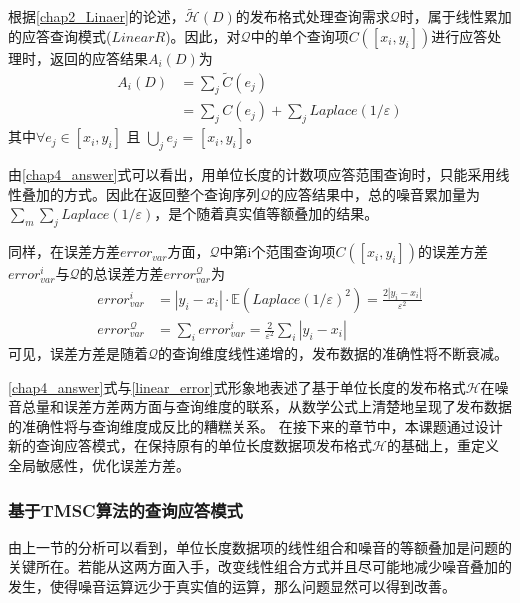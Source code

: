 根据\ref{chap2_Linaer}的论述，$\tilde{\mathcal{H}}(D)$的发布格式处理查询需求$\mathcal{Q}$时，属于线性累加的应答查询模式($LinearR$)。因此，对$\mathcal{Q}$中的单个查询项$C([x_{i},y_{i}])$进行应答处理时，返回的应答结果$A_{i}(D)$为
\begin{equation}
\label{chap4_answer}
\begin{split}
	A_{i}(D) &= \sum\limits_j \widetilde{C}(e_{j})\\
			 &= \sum\limits_j C(e_{j}) + \sum\limits_j \textit{Laplace}(1/\varepsilon)
\end{split}	
\end{equation}
其中$ \forall e_{j} \in [x_{i},y_{i}]$ 且 $\bigcup\limits_j e_{j}$ = $[x_{i},y_{i}]$。


由\ref{chap4_answer}式可以看出，用单位长度的计数项应答范围查询时，只能采用线性叠加的方式。因此在返回整个查询序列$\mathcal{Q}$的应答结果中，总的噪音累加量为$\sum\limits_m {\sum\limits_j \textit{Laplace}(1/\varepsilon)}$，是个随着真实值等额叠加的结果。

同样，在误差方差$error_{var}$方面，$\mathcal{Q}$中第i个范围查询项$C([x_{i},y_{i}])$的误差方差$error_{var}^{i}$与$\mathcal{Q}$的总误差方差$error_{var}^{\mathcal{Q}}$为
\begin{equation}
\label{linear_error}
\begin{split}
	error_{var}^{i} &= |y_{i}-x_{i}| \cdotp \mathbb{E}(\textit{Laplace}(1/ \varepsilon)^2) = \frac{2|y_{i}-x_{i}|}{\varepsilon^2} \\
	error_{var}^{\mathcal{Q}} &= \sum\limits_i error_{var}^{i} = \frac{2}{\varepsilon^2}\sum\limits_i |y_{i}-x_{i}|
\end{split}
\end{equation}
可见，误差方差是随着$\mathcal{Q}$的查询维度线性递增的，发布数据的准确性将不断衰减。

\ref{chap4_answer}式与\ref{linear_error}式形象地表述了基于单位长度的发布格式$\mathcal{H}$在噪音总量和误差方差两方面与查询维度的联系，从数学公式上清楚地呈现了发布数据的准确性将与查询维度成反比的糟糕关系。
在接下来的章节中，本课题通过设计新的查询应答模式，在保持原有的单位长度数据项发布格式$\mathcal{H}$的基础上，重定义全局敏感性，优化误差方差。


\subsubsection{基于TMSC算法的查询应答模式}

由上一节的分析可以看到，单位长度数据项的线性组合和噪音的等额叠加是问题的关键所在。若能从这两方面入手，改变线性组合方式并且尽可能地减少噪音叠加的发生，使得噪音运算远少于真实值的运算，那么问题显然可以得到改善。

